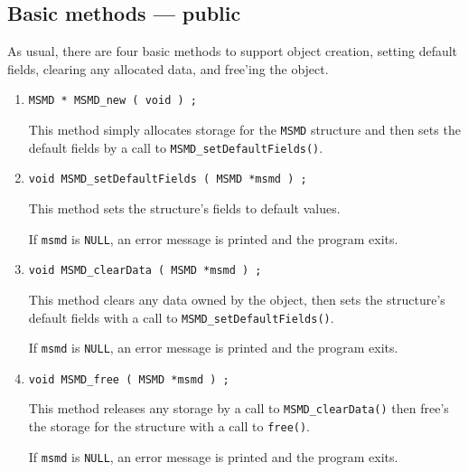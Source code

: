\subsection{Basic methods --- public}
\label{subsection:MSMD:proto:basics}
\par
As usual, there are four basic methods to support object creation,
setting default fields, clearing any allocated data, and free'ing
the object.
\par
\begin{enumerate}
\item
\begin{verbatim}
MSMD * MSMD_new ( void ) ;
\end{verbatim}
This method simply allocates storage for the {\tt MSMD} structure 
and then sets the default fields by a call to 
{\tt MSMD\_setDefaultFields()}.
\item
\begin{verbatim}
void MSMD_setDefaultFields ( MSMD *msmd ) ;
\end{verbatim}
This method sets the structure's fields to default values.
\par {}
If {\tt msmd} is {\tt NULL},
an error message is printed and the program exits.
\item
\begin{verbatim}
void MSMD_clearData ( MSMD *msmd ) ;
\end{verbatim}
This method clears any data owned by the object,
then sets the structure's default fields 
with a call to {\tt MSMD\_setDefaultFields()}.
\par {}
If {\tt msmd} is {\tt NULL},
an error message is printed and the program exits.
\item
\begin{verbatim}
void MSMD_free ( MSMD *msmd ) ;
\end{verbatim}
This method releases any storage by a call to 
{\tt MSMD\_clearData()} then free's the storage for the 
structure with a call to {\tt free()}.
\par {}
If {\tt msmd} is {\tt NULL},
an error message is printed and the program exits.
\end{enumerate}
\par
